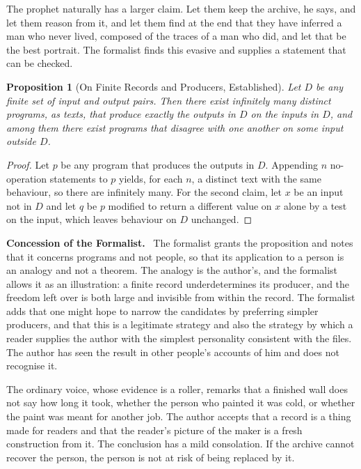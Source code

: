 \documentclass[11pt,openany,twoside]{book}
\theoremstyle{plain}
\newtheorem{proposition}{Proposition}[chapter]
\theoremstyle{definition}
\theoremstyle{remark}
\newenvironment{concession}{\par\medskip\noindent\textbf{Concession of the Formalist.}\ }{\par\medskip}
\begin{document}
The prophet naturally has a larger claim. Let them keep the archive, he says, and let them reason from it, and let them find at the end that they have inferred a man who never lived, composed of the traces of a man who did, and let that be the best portrait. The formalist finds this evasive and supplies a statement that can be checked.

\begin{proposition}[On Finite Records and Producers, Established]\label{prop:archive}
Let $D$ be any finite set of input and output pairs. Then there exist infinitely many distinct programs, as texts, that produce exactly the outputs in $D$ on the inputs in $D$, and among them there exist programs that disagree with one another on some input outside $D$.
\end{proposition}

\begin{proof}
Let $p$ be any program that produces the outputs in $D$. Appending $n$ no-operation statements to $p$ yields, for each $n$, a distinct text with the same behaviour, so there are infinitely many. For the second claim, let $x$ be an input not in $D$ and let $q$ be $p$ modified to return a different value on $x$ alone by a test on the input, which leaves behaviour on $D$ unchanged.
\end{proof}

\begin{concession}
The formalist grants the proposition and notes that it concerns programs and not people, so that its application to a person is an analogy and not a theorem. The analogy is the author's, and the formalist allows it as an illustration: a finite record underdetermines its producer, and the freedom left over is both large and invisible from within the record. The formalist adds that one might hope to narrow the candidates by preferring simpler producers, and that this is a legitimate strategy and also the strategy by which a reader supplies the author with the simplest personality consistent with the files. The author has seen the result in other people's accounts of him and does not recognise it.
\end{concession}

The ordinary voice, whose evidence is a roller, remarks that a finished wall does not say how long it took, whether the person who painted it was cold, or whether the paint was meant for another job. The author accepts that a record is a thing made for readers and that the reader's picture of the maker is a fresh construction from it. The conclusion has a mild consolation. If the archive cannot recover the person, the person is not at risk of being replaced by it.
\end{document}
